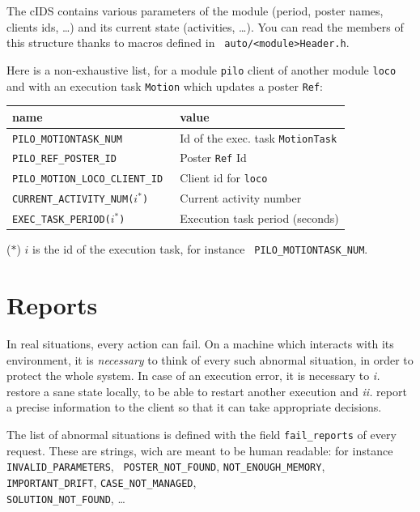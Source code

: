 The cIDS contains various parameters of the module (period, poster names,
clients ids, \ldots) and its current  state (activities, \ldots). You can
read  the members  of this  structure thanks   to macros  defined in {\tt
auto/<module>Header.h}.

Here is a non-exhaustive list, for a module {\tt  pilo} client of another
module {\tt loco} and with an execution task {\tt Motion} which updates a
poster {\tt Ref}:

\bigbreak

{\small\begin{tabularx}{0.8\linewidth}{|l|X|}
\hline
name & value\\
\hline
\tt PILO\_MOTIONTASK\_NUM    & Id of the exec. task {\tt MotionTask}\\
\tt PILO\_REF\_POSTER\_ID    & Poster {\tt Ref} Id\\
\tt PILO\_MOTION\_LOCO\_CLIENT\_ID & Client id for {\tt loco}\\
\tt CURRENT\_ACTIVITY\_NUM($i^*$) & Current activity number\\
\tt EXEC\_TASK\_PERIOD($i^*$) & Execution task period (seconds)\\
\hline
\end{tabularx}}

($*$)  $i$ is   the  id  of  the    execution  task, for   instance  {\tt
PILO\_MOTIONTASK\_NUM}.


\section{Reports}

In real situations, every action can fail. On a machine which
interacts with  its environment, it is {\em  necessary} to think of every
such abnormal situation, in order to protect the whole system. In case of
an execution error,  it  is necessary to {\em   i.} restore a sane  state
locally, to be able to restart another  execution and {\em ii.}  report a
precise information   to the  client so  that   it can   take appropriate
decisions.

The list of abnormal situations is defined with the field {\tt fail\_reports}
of every   request.  These   are strings,   wich are   meant to be  human
readable:       for      instance  {\tt      INVALID\_PARAMETERS},   {\tt
POSTER\_NOT\_FOUND}, {\tt NOT\_ENOUGH\_MEMORY},   {\tt IMPORTANT\_DRIFT},
{\tt CASE\_NOT\_MANAGED},\\ {\tt SOLUTION\_NOT\_FOUND}, \ldots

